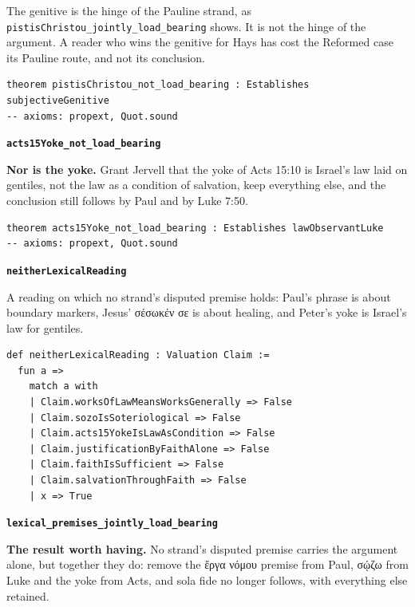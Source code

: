 \documentclass[11pt]{article}
\begin{document}
The genitive is the hinge of the Pauline strand, as \texttt{pistis\allowbreak{}Christou\_\allowbreak{}jointly\_\allowbreak{}load\_\allowbreak{}bearing} shows. It is not the hinge of the argument. A reader who wins the genitive for Hays has cost the Reformed case its Pauline route, and not its conclusion.

{\small\begin{verbatim}
theorem pistisChristou_not_load_bearing : Establishes subjectiveGenitive
-- axioms: propext, Quot.sound
\end{verbatim}}
\par\medskip\noindent\textbf{\texttt{acts15\allowbreak{}Yoke\_\allowbreak{}not\_\allowbreak{}load\_\allowbreak{}bearing}}\par\nobreak\noindent
\textbf{Nor is the yoke.} Grant Jervell that the yoke of Acts 15:10 is Israel's law laid on gentiles, not the law as a condition of salvation, keep everything else, and the conclusion still follows by Paul and by Luke 7:50.

{\small\begin{verbatim}
theorem acts15Yoke_not_load_bearing : Establishes lawObservantLuke
-- axioms: propext, Quot.sound
\end{verbatim}}
\par\medskip\noindent\textbf{\texttt{neither\allowbreak{}Lexical\allowbreak{}Reading}}\par\nobreak\noindent
A reading on which no strand's disputed premise holds: Paul's phrase is about boundary markers, Jesus' σέσωκέν σε is about healing, and Peter's yoke is Israel's law for gentiles.

{\small\begin{verbatim}
def neitherLexicalReading : Valuation Claim :=
  fun a =>
    match a with
    | Claim.worksOfLawMeansWorksGenerally => False
    | Claim.sozoIsSoteriological => False
    | Claim.acts15YokeIsLawAsCondition => False
    | Claim.justificationByFaithAlone => False
    | Claim.faithIsSufficient => False
    | Claim.salvationThroughFaith => False
    | x => True
\end{verbatim}}
\par\medskip\noindent\textbf{\texttt{lexical\_\allowbreak{}premises\_\allowbreak{}jointly\_\allowbreak{}load\_\allowbreak{}bearing}}\par\nobreak\noindent
\textbf{The result worth having.} No strand's disputed premise carries the argument alone, but together they do: remove the ἔργα νόμου premise from Paul, σῴζω from Luke and the yoke from Acts, and sola fide no longer follows, with everything else retained.
\end{document}
